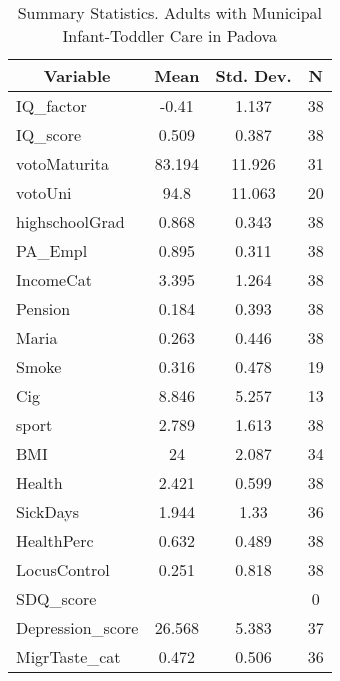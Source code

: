 
\begin{table}[htbp]\centering \caption{Summary Statistics. Adults with Municipal Infant-Toddler Care in Padova \label{bothAdultasiloMuniPadova}}
\begin{tabular}{l c c  c}\hline\hline
\multicolumn{1}{c}{\textbf{Variable}} & \textbf{Mean}
 & \textbf{Std. Dev.} & \textbf{N}\\ \hline
IQ\_factor & -0.41 & 1.137  & 38\\
IQ\_score & 0.509 & 0.387  & 38\\
votoMaturita & 83.194 & 11.926  & 31\\
votoUni & 94.8 & 11.063  & 20\\
highschoolGrad & 0.868 & 0.343  & 38\\
PA\_Empl & 0.895 & 0.311  & 38\\
IncomeCat & 3.395 & 1.264  & 38\\
Pension & 0.184 & 0.393  & 38\\
Maria & 0.263 & 0.446  & 38\\
Smoke & 0.316 & 0.478  & 19\\
Cig & 8.846 & 5.257  & 13\\
sport & 2.789 & 1.613  & 38\\
BMI & 24 & 2.087  & 34\\
Health & 2.421 & 0.599  & 38\\
SickDays & 1.944 & 1.33  & 36\\
HealthPerc & 0.632 & 0.489  & 38\\
LocusControl & 0.251 & 0.818  & 38\\
SDQ\_score &  &   & 0\\
Depression\_score & 26.568 & 5.383  & 37\\
MigrTaste\_cat & 0.472 & 0.506  & 36\\
\hline\end{tabular}
\end{table}
